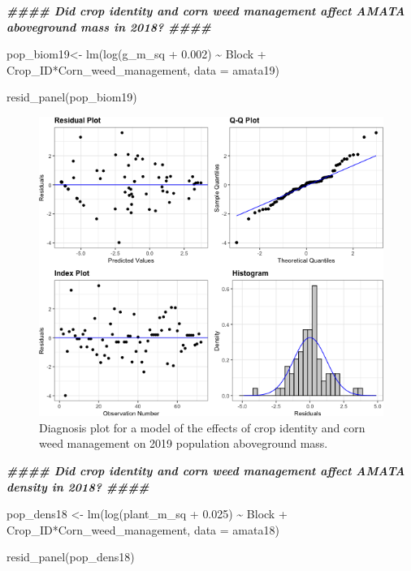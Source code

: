 \documentclass[
]{article}
\newenvironment{Shaded}{\begin{snugshade}}{\end{snugshade}}
\newcommand{\AttributeTok}[1]{\textcolor[rgb]{0.77,0.63,0.00}{#1}}
\newcommand{\DocumentationTok}[1]{\textcolor[rgb]{0.56,0.35,0.01}{\textbf{\textit{#1}}}}
\newcommand{\FloatTok}[1]{\textcolor[rgb]{0.00,0.00,0.81}{#1}}
\newcommand{\FunctionTok}[1]{\textcolor[rgb]{0.00,0.00,0.00}{#1}}
\newcommand{\NormalTok}[1]{#1}
\newcommand{\OtherTok}[1]{\textcolor[rgb]{0.56,0.35,0.01}{#1}}
\newcommand{\SpecialCharTok}[1]{\textcolor[rgb]{0.00,0.00,0.00}{#1}}
\begin{document}
\begin{Shaded}
\begin{Highlighting}[]
\DocumentationTok{\#\#\#\# Did crop identity and corn weed management affect AMATA aboveground mass in 2018? \#\#\#\#}

\NormalTok{pop\_biom19}\OtherTok{\textless{}{-}} \FunctionTok{lm}\NormalTok{(}\FunctionTok{log}\NormalTok{(g\_m\_sq }\SpecialCharTok{+} \FloatTok{0.002}\NormalTok{) }\SpecialCharTok{\textasciitilde{}}\NormalTok{ Block }\SpecialCharTok{+}\NormalTok{ Crop\_ID}\SpecialCharTok{*}\NormalTok{Corn\_weed\_management,}
                   \AttributeTok{data =}\NormalTok{ amata19)}

\FunctionTok{resid\_panel}\NormalTok{(pop\_biom19) }
\end{Highlighting}
\end{Shaded}

\begin{figure}
\includegraphics[width=1\linewidth]{AppendixC_model_diagnosis_files/figure-latex/pop-biom-19-1} \caption{Diagnosis plot for a model of the effects of crop identity and corn weed management on 2019 population aboveground mass.}\label{fig:pop-biom-19}
\end{figure}

\begin{Shaded}
\begin{Highlighting}[]
\DocumentationTok{\#\#\#\# Did crop identity and corn weed management affect AMATA density in 2018? \#\#\#\#}

\NormalTok{pop\_dens18 }\OtherTok{\textless{}{-}} \FunctionTok{lm}\NormalTok{(}\FunctionTok{log}\NormalTok{(plant\_m\_sq }\SpecialCharTok{+} \FloatTok{0.025}\NormalTok{) }\SpecialCharTok{\textasciitilde{}}\NormalTok{ Block }\SpecialCharTok{+}\NormalTok{ Crop\_ID}\SpecialCharTok{*}\NormalTok{Corn\_weed\_management, }
                   \AttributeTok{data =}\NormalTok{ amata18)}

\FunctionTok{resid\_panel}\NormalTok{(pop\_dens18) }
\end{Highlighting}
\end{Shaded}
\end{document}
